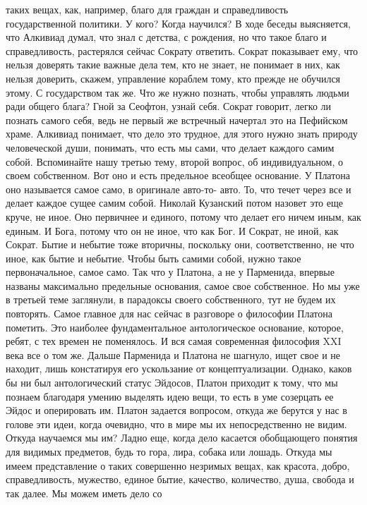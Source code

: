 таких вещах, как, например, благо для граждан и справедливость государственной
политики. У кого? Когда научился? В ходе беседы выясняется, что Алкивиад думал,
что знал с детства, с рождения, но что такое благо и справедливость, растерялся
сейчас Сократу ответить. Сократ показывает ему, что нельзя доверять такие важные
дела тем, кто не знает, не понимает в них, как нельзя доверить, скажем,
управление кораблем тому, кто прежде не обучился этому. С государством так же.
Что же нужно познать, чтобы управлять людьми ради общего блага? Гной за Сеофтон,
узнай себя. Сократ говорит, легко ли познать самого себя, ведь не первый же
встречный начертал это на Пефийском храме. Алкивиад понимает, что дело это
трудное, для этого нужно знать природу человеческой души, понимать, что есть мы
сами, что делает каждого самим собой. Вспоминайте нашу третью тему, второй
вопрос, об индивидуальном, о своем собственном. Вот оно и есть предельное
всеобщее основание. У Платона оно называется самое само, в оригинале авто-то-
авто. То, что течет через все и делает каждое сущее самим собой. Николай
Кузанский потом назовет это еще круче, не иное. Оно первичнее и единого, потому
что делает его ничем иным, как единым. И Бога, потому что он не иное, что как
Бог. И Сократ, не иной, как Сократ. Бытие и небытие тоже вторичны, поскольку
они, соответственно, не что иное, как бытие и небытие. Чтобы быть самими собой,
нужно такое первоначальное, самое само. Так что у Платона, а не у Парменида,
впервые названы максимально предельные основания, самое свое собственное. Но мы
уже в третьей теме заглянули, в парадоксы своего собственного, тут не будем их
повторять. Самое главное для нас сейчас в разговоре о философии Платона
пометить. Это наиболее фундаментальное антологическое основание, которое, ребят,
с тех времен не поменялось. И вся самая современная философия XXI века все о том
же. Дальше Парменида и Платона не шагнуло, ищет свое и не находит, лишь
констатируя его ускользание от концептуализации. Однако, каков бы ни был
антологический статус Эйдосов, Платон приходит к тому, что мы познаем благодаря
умению выделять идею вещи, то есть в уме созерцать ее Эйдос и оперировать им.
Платон задается вопросом, откуда же берутся у нас в голове эти идеи, когда
очевидно, что в мире мы их непосредственно не видим. Откуда научаемся мы им?
Ладно еще, когда дело касается обобщающего понятия для видимых предметов, будь
то гора, лира, собака или лошадь. Откуда мы имеем представление о таких
совершенно незримых вещах, как красота, добро, справедливость, мужество, единое
бытие, качество, количество, душа, свобода и так далее. Мы можем иметь дело со
